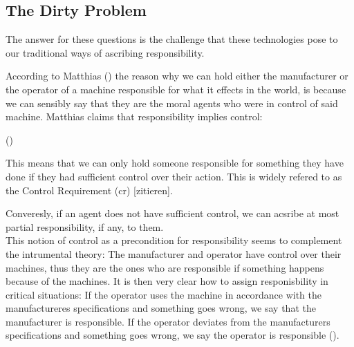\documentclass{article}
\begin{document}

%

\subsection{The Dirty Problem}

The answer for these questions is the challenge that these technologies pose to
our traditional ways of ascribing responsibility.

According to Matthias (\cite{Matthias_2004}) the reason why we can hold either the
manufacturer or the operator of a machine responsible for what it effects in the
world, is because we can sensibly say that they are the moral agents who were in
control of said machine. Matthias claims that responsibility implies control:

\vspace{.8em}
 (\cite[p.175]{Matthias_2004})

\vspace{.8em}
This means that we can only hold someone responsible for something they have
done if they had sufficient control over their action.
This is widely refered to as the Control Requirement (\acrshort{cr}) [zitieren].

Converesly, if an agent does not have sufficient control, we can acsribe at most
partial responsibility, if any, to them.\\
This notion of control as a precondition for responsibility seems to complement the intrumental theory: The
manufacturer and operator have control over their machines, thus they are the
ones who are responsible if something happens because of the machines.
It is then very clear how to assign responisbility in critical situations: If the operator uses the
machine in accordance with the manufactureres specifications and something goes
wrong, we say that the manufacturer is responsible. If the operator deviates
from the manufacturers specifications and something goes wrong, we say the
operator is responsible (\cite[p.175]{Matthias_2004}).
\end{document}
